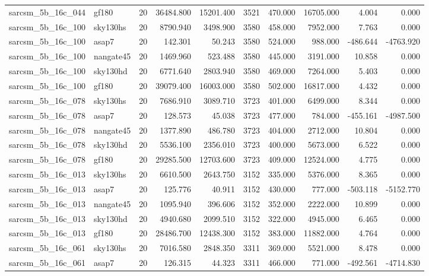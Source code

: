 \begin{longtable}{llrrrrrrrr}
sarcsm\_5b\_16c\_044 & gf180 & 20 & 36484.800 & 15201.400 & 3521 & 470.000 & 16705.000 & 4.004 & 0.000 \\
sarcsm\_5b\_16c\_100 & sky130hs & 20 & 8790.940 & 3498.900 & 3580 & 458.000 & 7952.000 & 7.763 & 0.000 \\
sarcsm\_5b\_16c\_100 & asap7 & 20 & 142.301 & 50.243 & 3580 & 524.000 & 988.000 & -486.644 & -4763.920 \\
sarcsm\_5b\_16c\_100 & nangate45 & 20 & 1469.960 & 523.488 & 3580 & 445.000 & 3191.000 & 10.858 & 0.000 \\
sarcsm\_5b\_16c\_100 & sky130hd & 20 & 6771.640 & 2803.940 & 3580 & 469.000 & 7264.000 & 5.403 & 0.000 \\
sarcsm\_5b\_16c\_100 & gf180 & 20 & 39079.400 & 16003.000 & 3580 & 502.000 & 16817.000 & 4.432 & 0.000 \\
sarcsm\_5b\_16c\_078 & sky130hs & 20 & 7686.910 & 3089.710 & 3723 & 401.000 & 6499.000 & 8.344 & 0.000 \\
sarcsm\_5b\_16c\_078 & asap7 & 20 & 128.573 & 45.038 & 3723 & 477.000 & 784.000 & -455.161 & -4987.500 \\
sarcsm\_5b\_16c\_078 & nangate45 & 20 & 1377.890 & 486.780 & 3723 & 404.000 & 2712.000 & 10.804 & 0.000 \\
sarcsm\_5b\_16c\_078 & sky130hd & 20 & 5536.100 & 2356.010 & 3723 & 400.000 & 5673.000 & 6.522 & 0.000 \\
sarcsm\_5b\_16c\_078 & gf180 & 20 & 29285.500 & 12703.600 & 3723 & 409.000 & 12524.000 & 4.775 & 0.000 \\
sarcsm\_5b\_16c\_013 & sky130hs & 20 & 6610.500 & 2643.750 & 3152 & 335.000 & 5376.000 & 8.365 & 0.000 \\
sarcsm\_5b\_16c\_013 & asap7 & 20 & 125.776 & 40.911 & 3152 & 430.000 & 777.000 & -503.118 & -5152.770 \\
sarcsm\_5b\_16c\_013 & nangate45 & 20 & 1095.940 & 396.606 & 3152 & 352.000 & 2222.000 & 10.899 & 0.000 \\
sarcsm\_5b\_16c\_013 & sky130hd & 20 & 4940.680 & 2099.510 & 3152 & 322.000 & 4945.000 & 6.465 & 0.000 \\
sarcsm\_5b\_16c\_013 & gf180 & 20 & 28486.700 & 12438.300 & 3152 & 383.000 & 11882.000 & 4.764 & 0.000 \\
sarcsm\_5b\_16c\_061 & sky130hs & 20 & 7016.580 & 2848.350 & 3311 & 369.000 & 5521.000 & 8.478 & 0.000 \\
sarcsm\_5b\_16c\_061 & asap7 & 20 & 126.315 & 44.323 & 3311 & 466.000 & 771.000 & -492.561 & -4714.830 \\

\end{longtable}
